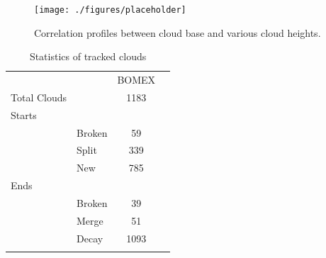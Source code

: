 \documentclass[acp]{copernicus}
\begin{document}
\begin{figure}[t]
\vspace*{2mm}
\begin{center}
\texttt{[image: ./figures/placeholder]}
\end{center}
\caption{Correlation profiles between cloud base and various cloud heights.}
\label{fig:cloud_envionment_histograms}
\end{figure}





\begin{table}[t]
\caption{Statistics of tracked clouds}
\vskip4mm
\centering
\begin{tabular}{llcr}
\tophline
&&BOMEX\\
\middlehline
Total Clouds&&1183\\
Starts\\
&Broken&59\\
&Split&339\\
&New&785\\
Ends\\
&Broken&39\\
&Merge&51\\
&Decay&1093\\

\bottomhline
\end{tabular}
\end{table}

\end{document}
